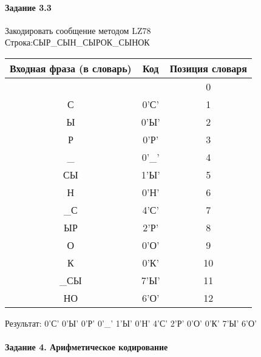 \documentclass[a4paper, 12pt]{article}
\begin{document}
\paragraph{Задание 3.3}

Закодировать сообщение методом LZ78\\
Строка:СЫР\_СЫН\_СЫРОК\_СЫНОК\\
\begin{table}[h!]
\centering
\begin{tabular}{|c|c|c|} 
\hline
 Входная фраза (в словарь) & Код & Позиция словаря \\ \hline

 &  & 0 \\ \hline
С & 0'С' & 1 \\ \hline
Ы & 0'Ы' & 2 \\ \hline
Р & 0'Р' & 3 \\ \hline
\_ & 0'\_' & 4 \\ \hline
СЫ & 1'Ы' & 5 \\ \hline
Н & 0'Н' & 6 \\ \hline
\_С & 4'С' & 7 \\ \hline
ЫР & 2'Р' & 8 \\ \hline
О & 0'О' & 9 \\ \hline
К & 0'К' & 10 \\ \hline
\_СЫ & 7'Ы' & 11 \\ \hline
НО & 6'О' & 12 \\ \hline
\end{tabular}
\end{table}

Результат: 0'С' 0'Ы' 0'Р' 0'\_' 1'Ы' 0'Н' 4'С' 2'Р' 0'О' 0'К' 7'Ы' 6'О'\\
\pagebreak
\paragraph{Задание 4. Арифметическое кодирование\\}
\end{document}
